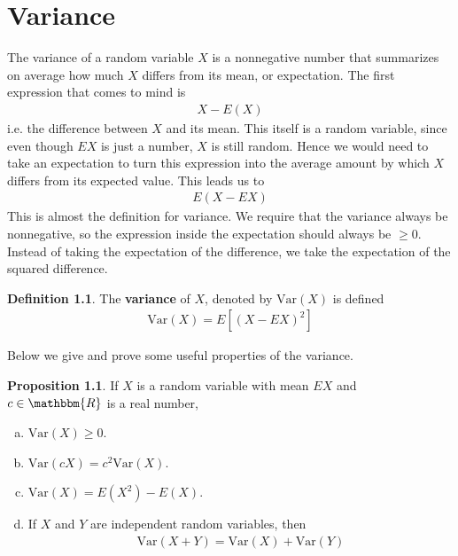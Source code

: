 \documentclass{tufte-book}
\newcommand\real{\mathbbm{R}}
\newcommand\var{\text{Var}}
\theoremstyle{definition}
\numberwithin{theorem}{section}
\newtheorem{definition}[theorem]{Definition}
\numberwithin{definition}{section}
\numberwithin{lemma}{section}
\numberwithin{corollary}{section}
\newtheorem{proposition}[theorem]{Proposition}
\numberwithin{proposition}{section}
\numberwithin{remark}{section}
\numberwithin{claim}{section}
\numberwithin{observation}{section}
\numberwithin{fact}{section}
\numberwithin{assumption}{section}
\numberwithin{example}{section}
\numberwithin{exercise}{section}
\begin{document}
\chapter{Variance}

The variance of a random variable $X$ is a nonnegative number that summarizes on average how much $X$ differs from its mean, or expectation. The first expression that comes to mind is 
\begin{align*}
X - E(X)
\end{align*}
i.e. the difference between $X$ and its mean. This itself is a random variable, since even though $EX$ is just a number, $X$ is still random. Hence we would need to take an expectation to turn this expression into the average amount by which $X$ differs from its expected value. This leads us to
\begin{align*}
E(X-EX)
\end{align*}
This is almost the definition for variance. We require that the variance always be nonnegative, so the expression inside the expectation should always be $\geq 0$. Instead of taking the expectation of the difference, we take the expectation of the squared difference.

\begin{definition}
The \textbf{variance} of $X$, denoted by $\var(X)$ is defined 
\begin{align*}
\var(X) = E[(X - EX)^2]
\end{align*}
\end{definition}
Below we give and prove some useful properties of the variance.
\begin{proposition}
If $X$ is a random variable with mean $EX$ and $c \in \real$ is a real number,
\begin{enumerate}[(a)]
\item $\var(X) \geq 0$.

\item $\var(cX) = c^2 \var(X)$.

\item $\var(X) = E(X^2) - E(X)$.

\item If $X$ and $Y$ are independent random variables, then
\begin{align*}
    \var(X + Y) = \var(X) + \var(Y)
\end{align*}
\end{enumerate}
\end{proposition}
\end{document}

